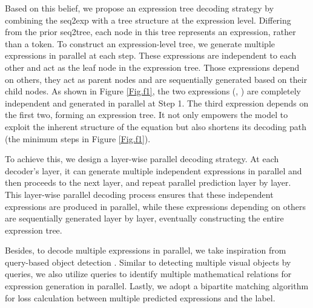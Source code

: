 \documentclass[11pt]{article}
\begin{document}
Based on this belief, we propose an expression tree decoding strategy by combining the seq2exp with a tree structure at the expression level. Differing from the prior seq2tree, each node in this tree represents an expression, rather than a token. To construct an expression-level tree, we generate multiple expressions in parallel at each step. These expressions are independent to each other and act as the leaf node in the expression tree. Those expressions depend on others, they act as parent nodes and are sequentially generated based on their child nodes. As shown in Figure \ref{Fig.f1}, the two expressions (, ) are completely independent and generated in parallel at Step 1. The third expression depends on the first two, forming an expression tree. It not only empowers the model to exploit the inherent structure of the equation but also shortens its decoding path (the minimum steps in Figure \ref{Fig.f1}).































To achieve this, we design a layer-wise parallel decoding strategy. At each decoder's layer, it can generate multiple independent expressions in parallel and then proceeds to the next layer, and repeat parallel prediction layer by layer. This layer-wise parallel decoding process ensures that these independent expressions are produced in parallel, while these expressions depending on others are sequentially generated layer by layer, eventually constructing the entire expression tree.

Besides, to decode multiple expressions in parallel, we take inspiration from query-based object detection \citep{carion2020end, jaegle2021perceiver, li2023blip}. Similar to detecting multiple visual objects by queries, we also utilize queries to identify multiple mathematical relations for expression generation in parallel. Lastly, we adopt a bipartite matching algorithm for loss calculation between multiple predicted expressions and the label. 
\end{document}
